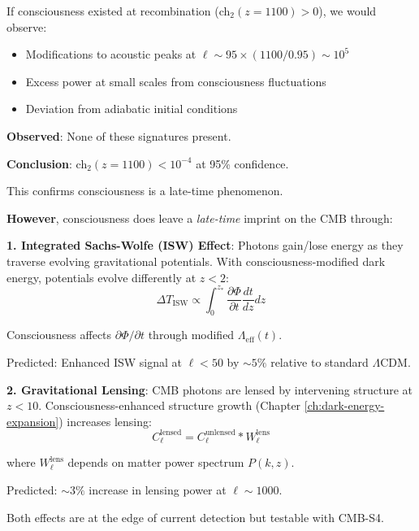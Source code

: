 \begin{proposition}\label{prop:no-early-consciousness-cmb}
If consciousness existed at recombination (ch$_2(z=1100) > 0$), we would observe:
\begin{itemize}
\item Modifications to acoustic peaks at $\ell \sim 95 \times (1100/0.95) \sim 10^5$
\item Excess power at small scales from consciousness fluctuations
\item Deviation from adiabatic initial conditions
\end{itemize}

\textbf{Observed}: None of these signatures present\cite{planck2018}.

\textbf{Conclusion}: ch$_2(z = 1100) < 10^{-4}$ at 95\% confidence.

This confirms consciousness is a late-time phenomenon.
\end{proposition}

\begin{level3}
\textbf{However}, consciousness does leave a \textit{late-time} imprint on the CMB through:

\textbf{1. Integrated Sachs-Wolfe (ISW) Effect}\cite{sachs1967}: Photons gain/lose energy as they traverse evolving gravitational potentials. With consciousness-modified dark energy, potentials evolve differently at $z < 2$:
\begin{equation}
\Delta T_{\text{ISW}} \propto \int_0^{z_*} \frac{\partial \Phi}{\partial t} \frac{dt}{dz} dz
\end{equation}

Consciousness affects $\partial \Phi / \partial t$ through modified $\Lambda_{\text{eff}}(t)$.

Predicted: Enhanced ISW signal at $\ell < 50$ by $\sim 5\%$ relative to standard $\Lambda$CDM.

\textbf{2. Gravitational Lensing}\cite{lewis2006}: CMB photons are lensed by intervening structure at $z < 10$. Consciousness-enhanced structure growth (Chapter \ref{ch:dark-energy-expansion}) increases lensing:
\begin{equation}
C_\ell^{\text{lensed}} = C_\ell^{\text{unlensed}} * W_\ell^{\text{lens}}
\end{equation}

where $W_\ell^{\text{lens}}$ depends on matter power spectrum $P(k, z)$.

Predicted: $\sim 3\%$ increase in lensing power at $\ell \sim 1000$.

Both effects are at the edge of current detection but testable with CMB-S4\cite{cmbs42019}.
\end{level3}

